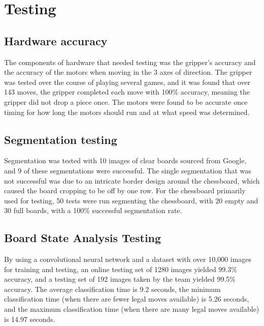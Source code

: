 \documentclass[onecolumn]{IEEEtran}
\begin{document}
\section{Testing}
\subsection{Hardware accuracy}
The components of hardware that needed testing was the gripper's accuracy and the accuracy of the motors when moving in the 3 axes of direction. The gripper was tested over the course of playing several games, and it was found that over 143 moves, the gripper completed each move with 100\% accuracy, meaning the gripper did not drop a piece once. The motors were found to be accurate once timing for how long the motors should run and at what speed was determined. 
\subsection{Segmentation testing}
Segmentation was tested with 10 images of clear boards sourced from Google, and 9 of these segmentations were successful. The single segmentation that was not successful was due to an intricate border design around the chessboard, which caused the board cropping to be off by one row. For the chessboard primarily used for testing, 50 tests were run segmenting the chessboard, with 20 empty and 30 full boards, with a 100\% successful segmentation rate. 
\subsection{Board State Analysis Testing}
By using a convolutional neural network and a dataset with over 10,000 images for training and testing, an online testing set of 1280 images yielded 99.3\% accuracy, and a testing set of 192 images taken by the team yielded 99.5\% accuracy. The average classification time is 9.2 seconds, the minimum classification time (when there are fewer legal moves available) is 5.26 seconds, and the maximum classification time (when there are many legal moves available) is 14.97 seconds.
\end{document}
